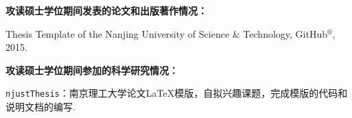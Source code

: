 \begin{publications}{99}
\item[] {\bf{攻读硕士学位期间发表的论文和出版著作情况：}}

\item Thesis Template of the Nanjing University of Science \& Technology, GitHub$^{\circledR}$, 2015.

\vspace{1.0cm}
\item[] {{\songti{}\bf{攻读硕士学位期间参加的科学研究情况：}}}
\setcounter{enumiv}{0}

\item \texttt{njustThesis}：南京理工大学论文\LaTeX{}模版，自拟兴趣课题，完成模版的代码和说明文档的编写.


\end{publications}
